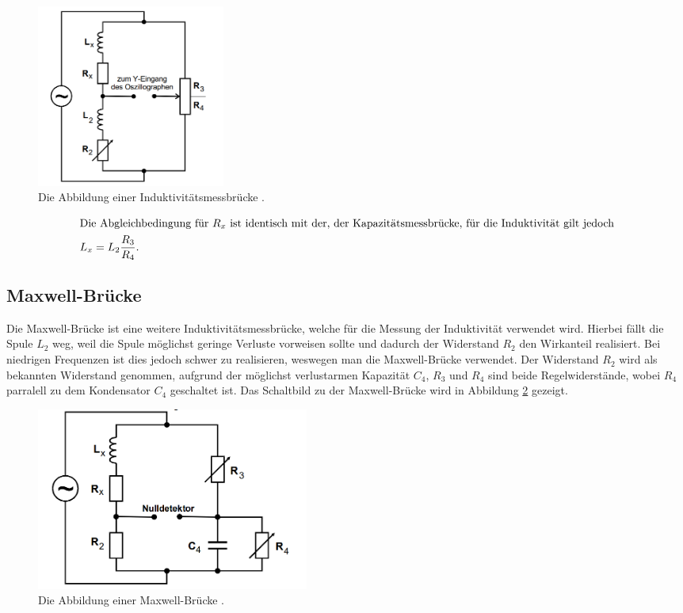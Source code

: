 \begin{figure}[H]
    \centering
    \includegraphics[height=60mm]{bilder/Abbildung6.png}
    \caption{Die Abbildung einer Induktivitätsmessbrücke    \cite{a1}. \label{Abbildung6} }
\end{figure}

\begin{align}
    \intertext{Die Abgleichbedingung für $R_{x}$ ist identisch mit der, der Kapazitätsmessbrücke, für die Induktivität gilt jedoch}
    L_{x} = L_{2}\frac{R_{3}}{R_{4}}. \label{6}
\end{align}

\subsection{Maxwell-Brücke}

\begin{flushleft}
    Die Maxwell-Brücke ist eine weitere Induktivitätsmessbrücke, welche für die Messung der Induktivität verwendet wird.
    Hierbei fällt die Spule $L_{2}$ weg, weil die Spule möglichst geringe Verluste vorweisen sollte und dadurch der Widerstand $R_{2}$ den Wirkanteil realisiert.
    Bei niedrigen Frequenzen ist dies jedoch schwer zu realisieren, weswegen man die Maxwell-Brücke verwendet. 
    Der Widerstand $R_{2}$ wird als bekannten Widerstand genommen, aufgrund der möglichst verlustarmen Kapazität $C_{4}$,
    $R_{3}$ und $R_{4}$ sind beide Regelwiderstände, wobei $R_{4}$ parralell zu dem Kondensator $C_{4}$ geschaltet ist. 
    Das Schaltbild zu der Maxwell-Brücke wird in Abbildung \ref{Abbildung7} gezeigt.
\end{flushleft}


\begin{figure}[H]
    \centering
    \includegraphics[height=60mm]{bilder/Abbildung7.png}
    \caption{Die Abbildung einer Maxwell-Brücke    \cite{a1}. \label{Abbildung7} }
\end{figure}

